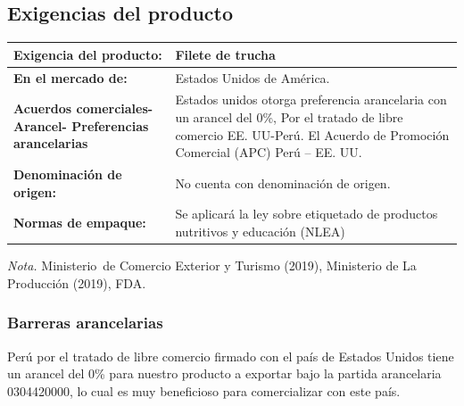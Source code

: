 \documentclass[
  stu,
  floatsintext,
  longtable,
  a4paper,
  nolmodern,
  notxfonts,
  notimes,
  12pt,
  colorlinks=true,linkcolor=blue,citecolor=blue,urlcolor=blue]{apa7}
\newcounter{none} %
\begin{document}
\subsection{Exigencias del producto}\label{exigencias-del-producto}

\begin{table}

{\caption{{Exigencias del producto a exportar}{\label{tbl-mytable}}}}

{\def\LTcaptype{none} %
\begin{longtable}[]{@{}
  >{\raggedright\arraybackslash}p{}
  >{\raggedright\arraybackslash}p{}@{}}
\toprule\noalign{}
\begin{minipage}[b]{\linewidth}\raggedright
\textbf{Exigencia del producto:}
\end{minipage} & \begin{minipage}[b]{\linewidth}\raggedright
Filete de trucha
\end{minipage} \\
\midrule\noalign{}
\endhead
\bottomrule\noalign{}
\endlastfoot
\textbf{En el mercado de:} & Estados Unidos de América. \\
\textbf{Acuerdos comerciales- Arancel- Preferencias arancelarias} &
Estados unidos otorga preferencia arancelaria con un arancel del 0\%,
Por el tratado de libre comercio EE. UU-Perú. El Acuerdo de Promoción
Comercial (APC) Perú -- EE. UU. \\
\textbf{Denominación de origen:} & No cuenta con denominación de
origen. \\
\textbf{Normas de empaque:} & Se aplicará la ley sobre etiquetado de
productos nutritivos y educación (NLEA) \\
\end{longtable}
}

\noindent \emph{Nota.} Ministerio~de Comercio Exterior y Turismo (2019),
Ministerio de La Producción (2019), FDA.

\end{table}

\subsubsection{Barreras arancelarias}\label{barreras-arancelarias}

Perú por el tratado de libre comercio firmado con el país de Estados
Unidos tiene un arancel del 0\% para nuestro producto a exportar bajo la
partida arancelaria 0304420000, lo cual es muy beneficioso para
comercializar con este país.
\end{document}
